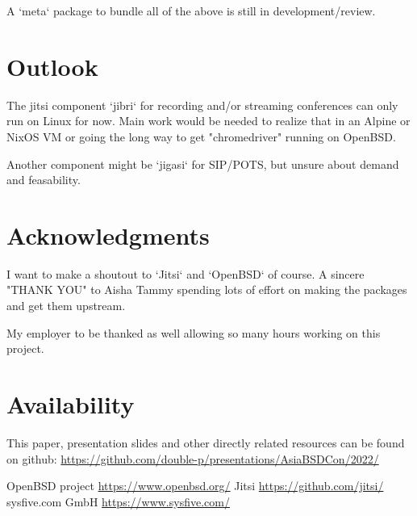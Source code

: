 \documentclass[10pt,conference]{IEEEtran}
\begin{document}
A `meta` package to bundle all of the above is still in development/review.

\section{Outlook}
The jitsi component `jibri` for recording and/or streaming conferences can only run
on Linux for now. Main work would be needed to realize that in an Alpine or NixOS VM or
going the long way to get "chromedriver" running on OpenBSD.

Another component might be `jigasi` for SIP/POTS, but unsure about demand and feasability.

\section{Acknowledgments}
I want to make a shoutout to `Jitsi` and `OpenBSD` of course. A sincere "THANK YOU" to
Aisha Tammy spending lots of effort on making the packages and get them upstream.

My employer to be thanked as well allowing so many hours working on this project.


\section{Availability}
This paper, presentation slides and other directly related resources can be found on github:
\url{https://github.com/double-p/presentations/AsiaBSDCon/2022/}


\begin{thebibliography}{00}
 OpenBSD project \url{https://www.openbsd.org/}
 Jitsi \url{https://github.com/jitsi/}
 sysfive.com GmbH \url{https://www.sysfive.com/}
\end{thebibliography}
\end{document}
